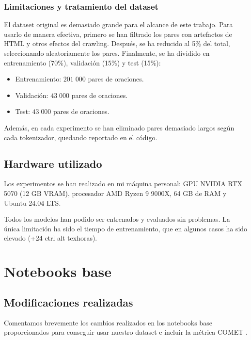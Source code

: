 \documentclass[11pt,spanish,listoffigures,listoftables]{tfgetsinf}
\begin{document}
\subsection{Limitaciones y tratamiento del dataset}
El dataset original es demasiado grande para el alcance de este trabajo. Para usarlo de manera efectiva, primero se han filtrado los pares con artefactos de HTML y otros efectos del crawling. Después, se ha reducido al 5\% del total, seleccionando aleatoriamente los pares. Finalmente, se ha dividido en entrenamiento (70\%), validación (15\%) y test (15\%):
\begin{itemize}
    \item Entrenamiento: $201\;000$ pares de oraciones.
    \item Validación: $43\;000$ pares de oraciones.
    \item Test: $43\;000$ pares de oraciones.
\end{itemize}

Además, en cada experimento se han eliminado pares demasiado largos según cada tokenizador, quedando reportado en el código.

\section{Hardware utilizado}
Los experimentos se han realizado en mi máquina personal: GPU NVIDIA RTX 5070 (12 GB VRAM), procesador AMD Ryzen 9 9000X, 64 GB de RAM y Ubuntu 24.04 LTS.

Todos los modelos han podido ser entrenados y evaluados sin problemas. La única limitación ha sido el tiempo de entrenamiento, que en algunos casos ha sido elevado (+24 ctrl alt texhoras).

\chapter{Notebooks base}
\section{Modificaciones realizadas}
Comentamos brevemente los cambios realizados en los notebooks base proporcionados para conseguir usar nuestro dataset e incluir la métrica COMET \cite{rei-etal-2020-comet-hf}.
\end{document}
